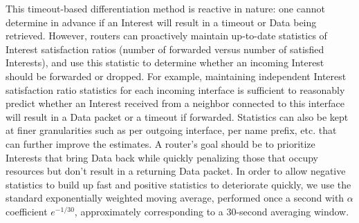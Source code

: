 \documentclass[10pt,conference]{IEEEtran}
\begin{document}
This timeout-based differentiation method is reactive in nature: one cannot determine in advance if an Interest will result in a timeout or Data being retrieved. However, routers can proactively maintain up-to-date statistics of Interest satisfaction ratios (number of forwarded versus number of satisfied Interests), and use this statistic to determine whether an incoming Interest should be forwarded or dropped. For example, maintaining independent Interest satisfaction ratio statistics for each incoming interface is sufficient to reasonably predict whether an Interest received from a neighbor connected to this interface will result in a Data packet or a timeout if forwarded. Statistics can also be kept at finer granularities such as per outgoing interface, per name prefix, etc. that can further improve the estimates. A router's goal should be to prioritize Interests that bring Data back while quickly penalizing those that occupy resources but don't result in a returning Data packet. In order to allow negative statistics to build up fast and positive statistics to  deteriorate quickly, we use the standard exponentially weighted moving average, performed once a second with $\alpha$ coefficient $e^{-1/30}$, approximately corresponding to a 30-second averaging window.



\end{document}
